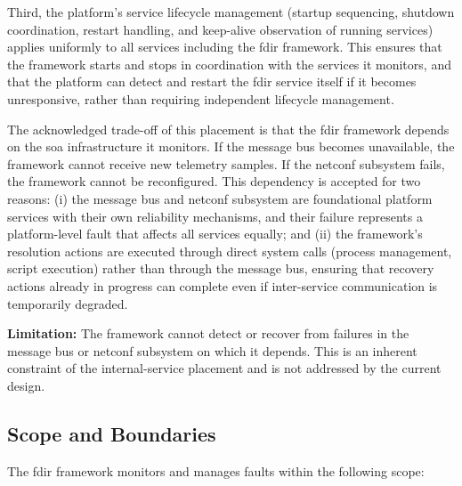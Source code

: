 Third, the platform's service lifecycle management (startup sequencing, shutdown coordination, restart handling, and keep-alive observation of running services) applies uniformly to all services including the \gls{fdir} framework. This ensures that the framework starts and stops in coordination with the services it monitors, and that the platform can detect and restart the \gls{fdir} service itself if it becomes unresponsive, rather than requiring independent lifecycle management.

The acknowledged trade-off of this placement is that the \gls{fdir} framework depends on the \gls{soa} infrastructure it monitors. If the message bus becomes unavailable, the framework cannot receive new telemetry samples. If the \gls{netconf} subsystem fails, the framework cannot be reconfigured. This dependency is accepted for two reasons: (i) the message bus and \gls{netconf} subsystem are foundational platform services with their own reliability mechanisms, and their failure represents a platform-level fault that affects all services equally; and (ii) the framework's resolution actions are executed through direct system calls (process management, script execution) rather than through the message bus, ensuring that recovery actions already in progress can complete even if inter-service communication is temporarily degraded.

\textbf{Limitation:} The framework cannot detect or recover from failures in the message bus or \gls{netconf} subsystem on which it depends. This is an inherent constraint of the internal-service placement and is not addressed by the current design.

\subsection{Scope and Boundaries}\label{sec:scope-boundaries}

The \gls{fdir} framework monitors and manages faults within the following scope:

